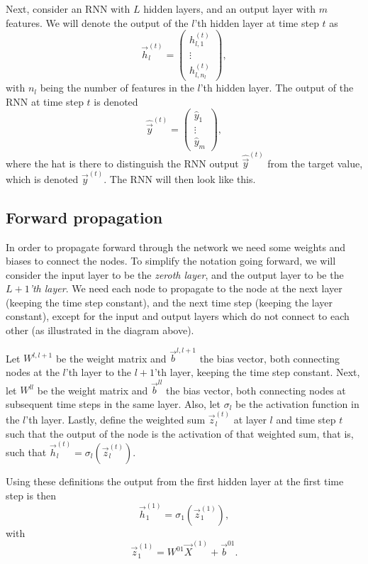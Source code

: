 \documentclass[11pt]{article}
\begin{document}
    Next, consider an RNN with \(L\) hidden layers, and an output layer with
\(m\) features. We will denote the output of the \(l\)'th hidden layer
at time step \(t\) as \[\vec{h}_l^{(t)} = \begin{pmatrix}
h_{l, 1}^{(t)} \\ \vdots \\ h_{l, n_l}^{(t)}
\end{pmatrix},\] with \(n_l\) being the number of features in the
\(l\)'th hidden layer. The output of the RNN at time step \(t\) is
denoted \[\hat{\vec{y}}^{(t)} = \begin{pmatrix}
\hat{y}_1 \\ \vdots \\ \hat{y}_m
\end{pmatrix},\] where the hat is there to distinguish the RNN output
\(\hat{\vec{y}}^{(t)}\) from the target value, which is denoted
\(\vec{y}^{(t)}\). The RNN will then look like this.

    

    \subsection{Forward propagation}\label{forward-propagation}

    In order to propagate forward through the network we need some weights
and biases to connect the nodes. To simplify the notation going forward,
we will consider the input layer to be the \emph{zeroth layer}, and the
output layer to be the \emph{\(L+1\)'th layer}. We need each node to
propagate to the node at the next layer (keeping the time step
constant), and the next time step (keeping the layer constant), except
for the input and output layers which do not connect to each other (as
illustrated in the diagram above).

    Let \(W^{l,l+1}\) be the weight matrix and \(\vec{b}^{l,l+1}\) the bias
vector, both connecting nodes at the \(l\)'th layer to the \(l+1\)'th
layer, keeping the time step constant. Next, let \(W^{ll}\) be the
weight matrix and \(\vec{b}^{ll}\) the bias vector, both connecting
nodes at subsequent time steps in the same layer. Also, let \(\sigma_l\)
be the activation function in the \(l\)'th layer. Lastly, define the
weighted sum \(\vec{z}_l^{(t)}\) at layer \(l\) and time step \(t\) such
that the output of the node is the activation of that weighted sum, that
is, such that \(\vec{h}_l^{(t)} = \sigma_l (\vec{z}_l^{(t)})\).

    Using these definitions the output from the first hidden layer at the
first time step is then
\[ \vec{h}_1^{(1)} = \sigma_1 \left( \vec{z}_1^{(1)} \right), \] with
\[ \vec{z}_1^{(1)} = W^{01} \vec{X}^{(1)} + \vec{b}^{01}.\]
\end{document}
